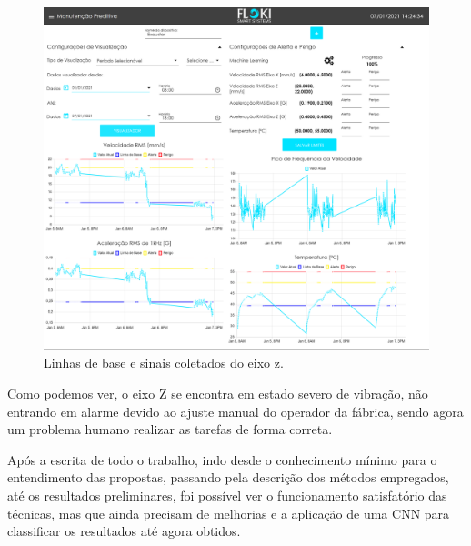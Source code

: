 \begin{figure}[H]
    \caption{Linhas de base e sinais coletados do eixo z.}
    \begin{center}
        \includegraphics[scale=.15]{resultados/img/drakkar_eixo_y.png}
    \end{center}
    \label{fig:ica}
\end{figure}

Como podemos ver, o eixo Z se encontra em estado severo de vibração, não entrando em alarme devido ao ajuste manual do operador da fábrica,
sendo agora um problema humano realizar as tarefas de forma correta.


Após a escrita de todo o trabalho, indo desde o conhecimento mínimo para o entendimento das propostas, passando pela descrição dos métodos
empregados, até os resultados preliminares, foi possível ver o funcionamento satisfatório das técnicas, mas que ainda precisam de melhorias
e a aplicação de uma CNN para classificar os resultados até agora obtidos. 

